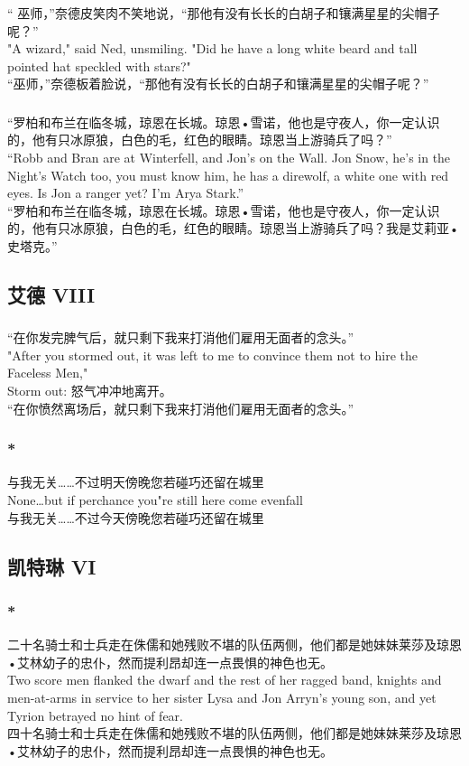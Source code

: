 \documentclass[12pt,a4paper]{article}
\newcommand{\h}[1]{{\color{red}#1}\\}
\newcommand{\la}[1]{{\color{blue}#1}\\}
\begin{document}
\subsubsection{}\la{		 
“ 巫师，”奈德皮笑肉不笑地说，“那他有没有长长的白胡子和镶满星星的尖帽子呢？”\\
"A wizard," said Ned, unsmiling. "Did he have a long white beard and tall pointed hat speckled with stars?"}
“巫师，”奈德板着脸说，“那他有没有长长的白胡子和镶满星星的尖帽子呢？”


\subsubsection{}\la{
	“罗柏和布兰在临冬城，琼恩在长城。琼恩•雪诺，他也是守夜人，你一定认识的，他有只冰原狼，白色的毛，红色的眼睛。琼恩当上游骑兵了吗？”\\
	“Robb and Bran are at Winterfell, and Jon's on the Wall. Jon Snow, he's in the Night's Watch too, you must know him, he has a direwolf, a white one with red eyes. Is Jon a ranger yet? I'm Arya Stark.”}
	“罗柏和布兰在临冬城，琼恩在长城。琼恩•雪诺，他也是守夜人，你一定认识的，他有只冰原狼，白色的毛，红色的眼睛。琼恩当上游骑兵了吗？我是艾莉亚•史塔克。”
						
\subsection{艾德 VIII}\label{1.33}
\subsubsection{}\la{
	“在你发完脾气后，就只剩下我来打消他们雇用无面者的念头。”\\
	"After you stormed out, it was left to me to convince them not to hire the Faceless Men,"}\h{
	Storm out: 怒气冲冲地离开。}
	“在你愤然离场后，就只剩下我来打消他们雇用无面者的念头。”
	
\subsubsection{\color{red}*}\la{
	与我无关……不过明天傍晚您若碰巧还留在城里\\
	None\ldots but if perchance you"re still here come evenfall}
	与我无关……不过今天傍晚您若碰巧还留在城里
		
\subsection{凯特琳 VI}		
\subsubsection{\color{red}*}\la{
	二十名骑士和士兵走在侏儒和她残败不堪的队伍两侧，他们都是她妹妹莱莎及琼恩•艾林幼子的忠仆，然而提利昂却连一点畏惧的神色也无。\\
	Two score men flanked the dwarf and the rest of her ragged band, knights and men-at-arms in service to her sister Lysa and Jon Arryn's young son, and yet Tyrion betrayed no hint of fear. }
	四十名骑士和士兵走在侏儒和她残败不堪的队伍两侧，他们都是她妹妹莱莎及琼恩•艾林幼子的忠仆，然而提利昂却连一点畏惧的神色也无。
	
\end{document}
